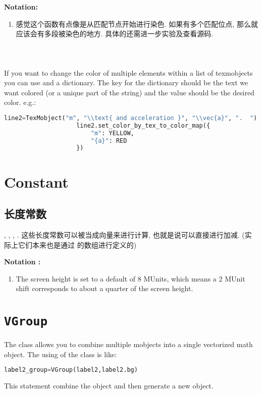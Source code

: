             \textbf{Notation:}
                \begin{enumerate}
                    \item 感觉这个函数有点像是从匹配节点开始进行染色. 如果有多个匹配位点, 那么就应该会有多段被染色的地方. 具体的还需进一步实验及查看源码.
                \end{enumerate}

        \paragraph{ \\}
            \hspace*{2em}If you want to change the color of multiple elements within a list of texmobjects you can use  and a dictionary. The key for the dictionary should be the text we want colored (or a unique part of the string) and the value should be the desired color. e.g.:
                \begin{lstlisting}[language = {Python}, gobble = 20]
                    line2=TexMobject("m", "\\text{ and acceleration }", "\\vec{a}", ".  ")
                    line2.set_color_by_tex_to_color_map({
                        "m": YELLOW,
                        "{a}": RED
                    })
                \end{lstlisting}


\section{Constant}
    \subsection{长度常数}
        , , , . 这些长度常数可以被当成向量来进行计算, 也就是说可以直接进行加减. (实际上它们本来也是通过  的数组进行定义的)

        \textbf{Notation :}
            \begin{enumerate}
                \item The screen height is set to a default of 8 MUnits, which means a 2 MUnit shift corresponds to about a quarter of the screen height.
            \end{enumerate}

\section{\texttt{VGroup}}
    \hspace*{2em}The  class allows you to combine multiple mobjects into a single vectorized math object. The using of the class is like:
        \begin{lstlisting}[language = {Python}, gobble = 12]
            label2_group=VGroup(label2,label2.bg)
        \end{lstlisting}
    This statement combine the object  and  then generate a new object.

